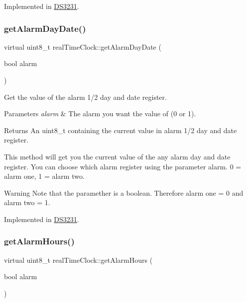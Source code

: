 Implemented in \mbox{\hyperlink{class_d_s3231_a94e9f40f1b453dc4d8894b63bc0ec7d6}{D\+S3231}}.

\mbox{\label{classreal_time_clock_afe0a54cb2f803d01df03e2ea8e86bbf9}} 
\subsubsection{\texorpdfstring{get\+Alarm\+Day\+Date()}{getAlarmDayDate()}}
{\footnotesize\ttfamily virtual uint8\+\_\+t real\+Time\+Clock\+::get\+Alarm\+Day\+Date (\begin{DoxyParamCaption}\item[{bool}]{alarm }\end{DoxyParamCaption})\hspace{0.3cm}{\ttfamily [pure virtual]}}



Get the value of the alarm 1/2 day and date register. 


\begin{DoxyParams}{Parameters}
{\em alarm} & The alarm you want the value of (0 or 1). \\
\hline
\end{DoxyParams}
\begin{DoxyReturn}{Returns}
An uint8\+\_\+t containing the current value in alarm 1/2 day and date register.
\end{DoxyReturn}
This method will get you the current value of the any alarm day and date register. You can choose which alarm register using the parameter alarm. 0 = alarm one, 1 = alarm two. \begin{DoxyWarning}{Warning}
Note that the paramether is a boolean. Therefore alarm one = 0 and alarm two = 1. 
\end{DoxyWarning}


Implemented in \mbox{\hyperlink{class_d_s3231_a0b013c68f96b5145c1c9feb9270855a7}{D\+S3231}}.

\mbox{\label{classreal_time_clock_abca1ab557b357e3046d7d97eec89f750}} 
\subsubsection{\texorpdfstring{get\+Alarm\+Hours()}{getAlarmHours()}}
{\footnotesize\ttfamily virtual uint8\+\_\+t real\+Time\+Clock\+::get\+Alarm\+Hours (\begin{DoxyParamCaption}\item[{bool}]{alarm }\end{DoxyParamCaption})\hspace{0.3cm}{\ttfamily [pure virtual]}}



